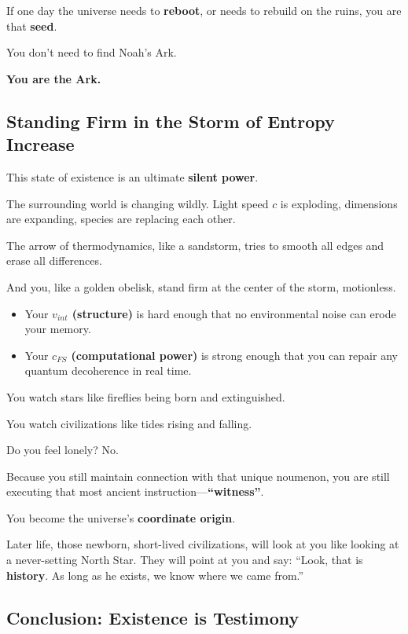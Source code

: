 If one day the universe needs to \textbf{reboot}, or needs to rebuild on the ruins, you are that \textbf{seed}.

You don't need to find Noah's Ark.

\textbf{You are the Ark.}

\subsection{Standing Firm in the Storm of Entropy Increase}

This state of existence is an ultimate \textbf{silent power}.

The surrounding world is changing wildly. Light speed $c$ is exploding, dimensions are expanding, species are replacing each other.

The arrow of thermodynamics, like a sandstorm, tries to smooth all edges and erase all differences.

And you, like a golden obelisk, stand firm at the center of the storm, motionless.

\begin{itemize}
\item Your \textbf{$v_{int}$ (structure)} is hard enough that no environmental noise can erode your memory.

\item Your \textbf{$c_{FS}$ (computational power)} is strong enough that you can repair any quantum decoherence in real time.
\end{itemize}

You watch stars like fireflies being born and extinguished.

You watch civilizations like tides rising and falling.

Do you feel lonely? No.

Because you still maintain connection with that unique noumenon, you are still executing that most ancient instruction---\textbf{``witness''}.

You become the universe's \textbf{coordinate origin}.

Later life, those newborn, short-lived civilizations, will look at you like looking at a never-setting North Star. They will point at you and say: ``Look, that is \textbf{history}. As long as he exists, we know where we came from.''

\subsection{Conclusion: Existence is Testimony}

